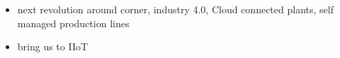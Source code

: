\begin{itemize}
\item next revolution around corner, industry 4.0, Cloud connected plants, self managed production lines
\item bring us to IIoT 
\end{itemize}
